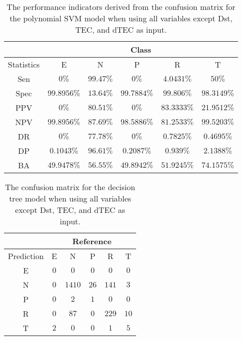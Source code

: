 \begin{table}[!ht]
	\centering
	\begin{tabular}{|c|c|c|c|c|c|}
		\hline
		 & \multicolumn{5}{c|}{Class} \\ \hline
		Statistics & E & N & P & R & T \\ \hline
		Sen & $0\%$ & $99.47\%$ & $0\%$ & $4.0431\%$ & $50\%$ \\ \hline
		Spec & $99.8956\%$ & $13.64\%$ & $99.7884\%$ & $99.806\%$ & $98.3149\%$ \\ \hline
		PPV & $0\%$ & $80.51\%$ & $0\%$ & $83.3333\%$ & $21.9512\%$ \\ \hline
		NPV & $99.8956\%$ & $87.69\%$ & $98.5886\%$ & $81.2533\%$ & $99.5203\%$ \\ \hline
		DR & $0\%$ & $77.78\%$ & $0\%$ & $0.7825\%$ & $0.4695\%$ \\ \hline
		DP & $0.1043\%$ & $96.61\%$ & $0.2087\%$ & $0.939\%$ & $2.1388\%$ \\ \hline
		BA & $49.9478\%$ & $56.55\%$ & $49.8942\%$ & $51.9245\%$ & $74.1575\%$ \\ \hline
	\end{tabular}
	\caption{The performance indicators derived from the confusion matrix for the polynomial SVM model when using all variables except Dst, TEC, and dTEC as input.}
	\label{tab:cs:reverse:noTEC:svmPoly}
\end{table}

\begin{table}[!ht]
	\centering
	\begin{tabular}{|c|c|c|c|c|c|}
		\hline
		 & \multicolumn{5}{|c|}{Reference} \\ \hline
		 Prediction & E & N & P & R & T \\ \hline
		 E & $0$ & $0$ & $0$ & $0$ & $0$ \\ \hline
		 N & $0$ & $1410$ & $26$ & $141$ & $3$ \\ \hline
		 P & $0$ & $2$ & $1$ & $0$ & $0$ \\ \hline
		 R & $0$ & $87$ & $0$ & $229$ & $10$ \\ \hline
		 T & $2$ & $0$ & $0$ & $1$ & $5$ \\ \hline
	\end{tabular}
	\caption{The confusion matrix for the decision tree model when using all variables except Dst, TEC, and dTEC as input.}
	\label{tab:cm:noTEC:C5.0}
\end{table}

